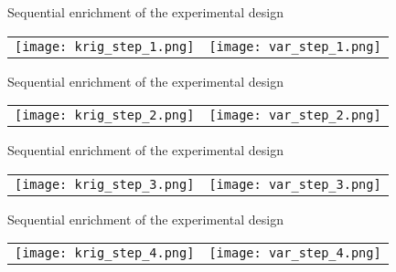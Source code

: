 \documentclass[9pt]{beamer}
\begin{document}

\begin{frame}{Sequential enrichment of the experimental design}

\begin{tabular}{cc}
\texttt{[image: krig\_step\_1.png]} &
\texttt{[image: var\_step\_1.png]}
\end{tabular}

\end{frame}



\begin{frame}{Sequential enrichment of the experimental design}

\begin{tabular}{cc}
\texttt{[image: krig\_step\_2.png]} &
\texttt{[image: var\_step\_2.png]}
\end{tabular}


\end{frame}


\begin{frame}{Sequential enrichment of the experimental design}

\begin{tabular}{cc}
\texttt{[image: krig\_step\_3.png]}&
\texttt{[image: var\_step\_3.png]}
\end{tabular}


\end{frame}


\begin{frame}{Sequential enrichment of the experimental design}

\begin{tabular}{cc}
\texttt{[image: krig\_step\_4.png]} &
\texttt{[image: var\_step\_4.png]}
\end{tabular}


\end{frame}
\end{document}
